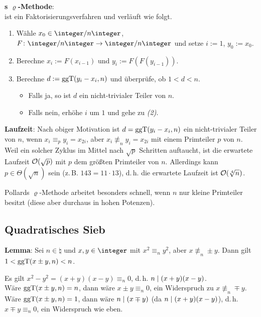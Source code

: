 \linie

\textbf{s $\varrho$-Methode}:\\
 ist ein Faktorisierungsverfahren und verläuft wie
folgt.
\begin{enumerate}
    \item
    Wähle $x_0 \in \ZnZ$, $F\colon \ZnZ \rightarrow \ZnZ$
    und setze $i := 1$, $y_0 := x_0$.
    
    \item
    Berechne $x_i := F(x_{i-1})$ und $y_i := F(F(y_{i-1}))$.
    
    \item
    Berechne $d := \operatorname{ggT}(y_i - x_i, n)$ und überprüfe, ob $1 < d < n$.
    \begin{itemize}
        \item
        Falls ja, so ist $d$ ein nicht-trivialer Teiler von $n$.
        
        \item
        Falls nein, erhöhe $i$ um $1$ und gehe zu \emph{(2)}.
    \end{itemize}
\end{enumerate}

\linie

\textbf{Laufzeit}:
Nach obiger Motivation ist $d = \operatorname{ggT}(y_i - x_i, n)$ ein nicht-trivialer Teiler von $n$, wenn
$x_i \equiv_p y_i = x_{2i}$, aber $x_i \not\equiv_n y_i = x_{2i}$ mit einem Primteiler $p$ von $n$.
Weil ein solcher Zyklus im Mittel nach $\sqrt{p}$ Schritten auftaucht,
ist die erwartete Laufzeit $\mathcal{O}(\sqrt{p})$ mit $p$ dem größten Primteiler von $n$.
Allerdings kann $p \in \Theta(\sqrt{n})$ sein (z.\,B. $143 = 11 \cdot 13$), d.\,h.
die erwartete Laufzeit ist $\mathcal{O}(\sqrt[4]{n})$.

Pollards $\varrho$-Methode arbeitet besonders schnell, wenn $n$ nur kleine Primteiler besitzt
(diese aber durchaus in hohen Potenzen).

\pagebreak

\subsection{%
    Quadratisches Sieb%
}

\textbf{Lemma}:
Sei $n \in \natural$ und $x, y \in \integer$ mit $x^2 \equiv_n y^2$, aber $x \not\equiv_n \pm y$.
Dann gilt $1 < \operatorname{ggT}(x \pm y, n) < n$.

\begin{Beweis}
    Es gilt $x^2 - y^2 = (x + y)(x - y) \equiv_n 0$, d.\,h. $n \mid (x + y)(x - y)$.\\
    Wäre $\operatorname{ggT}(x \pm y, n) = n$, dann wäre $x \pm y \equiv_n 0$,
    ein Widerspruch zu $x \not\equiv_n \mp y$.\\
    Wäre $\operatorname{ggT}(x \pm y, n) = 1$, dann wäre $n \mid (x \mp y)$
    (da $n \mid (x + y)(x - y)$), d.\,h. $x \mp y \equiv_n 0$,
    ein Widerspruch wie eben.
\end{Beweis}

